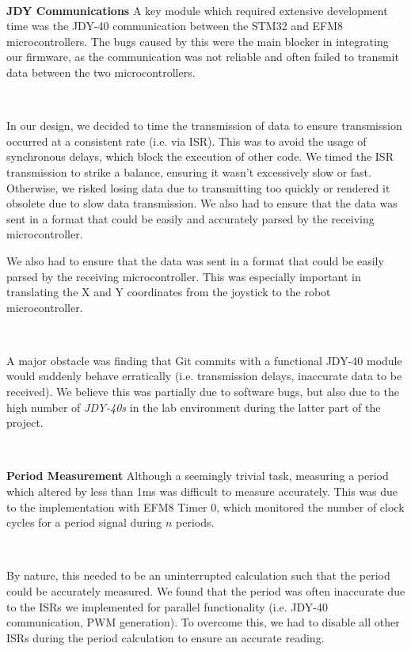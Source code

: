 \documentclass{article}
\begin{document}
\

\textbf{JDY Communications}
A key module which required extensive development time was the JDY-40 communication between the STM32 and EFM8 microcontrollers.
The bugs caused by this were the main blocker in integrating our firmware, as the communication was not reliable and often failed to transmit
data between the two microcontrollers.

\

In our design, we decided to time the transmission of data to ensure transmission occurred at a consistent rate (i.e. via ISR).
This was to avoid the usage of synchronous delays, which block the execution of other code. We timed the ISR transmission to strike a balance,
ensuring it wasn't excessively slow or fast. Otherwise, we risked losing data due to transmitting too quickly or rendered it obsolete
due to slow data transmission. We also had to ensure that the data was sent in a format that could be easily and accurately parsed by the
receiving microcontroller.

We also had to ensure that the data was sent in a format that could be easily parsed by the receiving microcontroller. This was especially important in translating the
X and Y coordinates from the joystick to the robot microcontroller.

\

A major obstacle was finding that Git commits with a functional JDY-40 module would suddenly behave erratically
(i.e. transmission delays, inaccurate data to be received). We believe this was partially due to software bugs, but also due to the high number of \textit{JDY-40s}
in the lab environment during the latter part of the project.

\

\textbf{Period Measurement}
Although a seemingly trivial task, measuring a period which altered by less than
1ms was difficult to measure accurately. This was due to the implementation with EFM8 Timer 0,
which monitored the number of clock cycles for a period signal during $n$ periods.

\

By nature, this needed to be an uninterrupted calculation such that the period could be accurately measured. We found that the period was often inaccurate due to the ISRs we implemented for
parallel functionality (i.e. JDY-40 communication, PWM generation). To overcome this, we had to disable all other ISRs during the period calculation to ensure an accurate reading.
\end{document}
